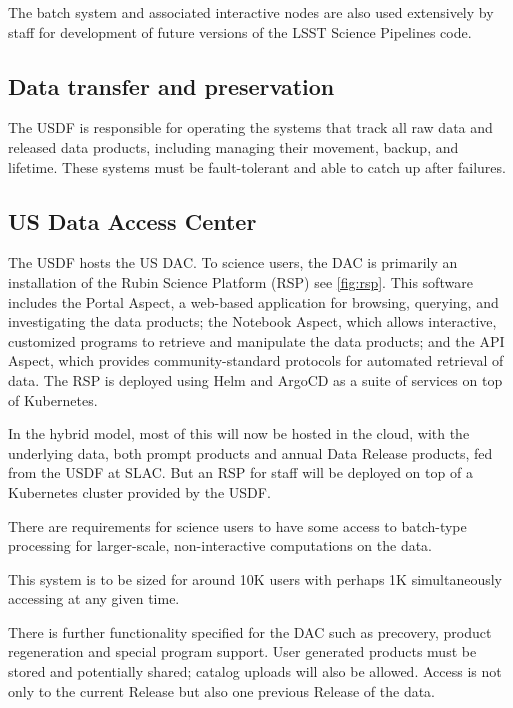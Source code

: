 The batch system and associated interactive nodes are also used extensively by staff for development of future versions of the LSST Science Pipelines code.

\subsection{Data transfer and preservation} \label{req:dbb}
The USDF is responsible for operating the systems that track all raw data and released data products, including managing their movement, backup, and lifetime.
These systems must be fault-tolerant and able to catch up after failures.

\subsection{US Data Access Center}
The USDF hosts the US DAC.
To science users, the DAC is primarily an installation of the Rubin Science Platform (RSP) see \autoref{fig:rsp}.
This software includes the Portal Aspect, a web-based application for browsing, querying, and investigating the data products; the Notebook Aspect, which allows interactive, customized programs to retrieve and manipulate the data products; and the API Aspect, which provides community-standard protocols for automated retrieval of data.
The RSP is deployed using Helm and ArgoCD as a suite of services on top of Kubernetes.

In the hybrid model, most of this will now be hosted in the cloud, with the underlying data, both prompt products and annual Data Release products, fed from the USDF at SLAC.
But an RSP for staff will be deployed on top of a Kubernetes cluster provided by the USDF.

There are requirements for science users to have some access to batch-type processing for larger-scale, non-interactive computations on the data.

This system is to be sized for around 10K users with perhaps 1K simultaneously accessing at any given time.

There is further functionality specified for the DAC such as precovery, product regeneration and special program support.
User generated products must be stored and potentially shared; catalog uploads will also be allowed.
Access is not only to the current Release but also one previous Release of the data.
